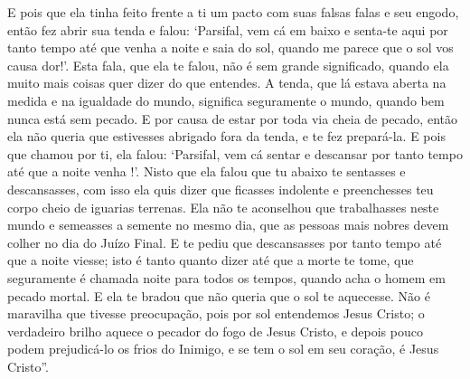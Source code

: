 E pois que ela tinha feito frente a ti um pacto com suas falsas falas e seu
engodo, então fez abrir sua tenda e falou: ‘Parsifal, vem cá em baixo e
senta-te aqui por tanto tempo até que venha a noite e saia do sol, quando me
parece que o sol vos causa dor!’. Esta fala, que ela te falou, não é sem grande
significado, quando ela muito mais coisas quer dizer do que entendes. A tenda,
que lá estava aberta na medida e na igualdade do mundo, significa seguramente o
mundo, quando bem nunca está sem pecado. E por causa de estar por toda via
cheia de pecado, então ela não queria que estivesses abrigado fora da tenda, e
te fez prepará-la. E pois que chamou por ti, ela falou: ‘Parsifal, vem cá
sentar e descansar por tanto tempo até que a noite venha !’. Nisto que ela
falou que tu abaixo te sentasses e descansasses, com isso ela quis dizer que
ficasses indolente e preenchesses teu corpo cheio de iguarias terrenas. Ela não
te aconselhou que trabalhasses neste mundo e semeasses a semente no mesmo dia,
que as pessoas mais nobres devem colher no dia do Juízo Final. E te pediu que
descansasses por tanto tempo até que a noite viesse; isto é tanto quanto dizer
até que a morte te tome, que seguramente é chamada noite para todos os tempos,
quando acha o homem em pecado mortal. E ela te bradou que não queria que o sol
te aquecesse. Não é maravilha que tivesse preocupação, pois por sol entendemos
Jesus Cristo; o verdadeiro brilho aquece o pecador do fogo de Jesus Cristo, e
depois pouco podem prejudicá-lo os frios do Inimigo, e se tem o sol em seu
coração, é Jesus Cristo”.  

